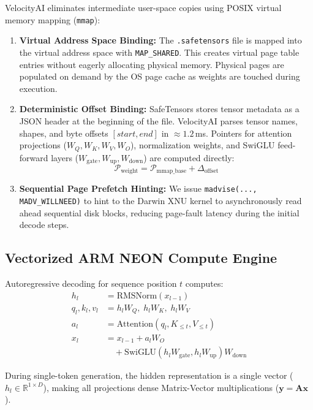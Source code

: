 \documentclass[10pt,twocolumn]{article}
\begin{document}
VelocityAI eliminates intermediate user-space copies using POSIX virtual memory mapping (\texttt{mmap}):
\begin{enumerate}
    \item \textbf{Virtual Address Space Binding:} The \texttt{.safetensors} file is mapped into the virtual address space with \texttt{MAP\_SHARED}. This creates virtual page table entries without eagerly allocating physical memory. Physical pages are populated on demand by the OS page cache as weights are touched during execution.
    \item \textbf{Deterministic Offset Binding:} SafeTensors stores tensor metadata as a JSON header at the beginning of the file. VelocityAI parses tensor names, shapes, and byte offsets $[start, end]$ in $\approx 1.2$\,ms. Pointers for attention projections ($W_Q, W_K, W_V, W_O$), normalization weights, and SwiGLU feed-forward layers ($W_{\text{gate}}, W_{\text{up}}, W_{\text{down}}$) are computed directly:
    \begin{equation}
    \mathcal{P}_{\text{weight}} = \mathcal{P}_{\text{mmap\_base}} + \Delta_{\text{offset}}
    \end{equation}
    \item \textbf{Sequential Page Prefetch Hinting:} We issue \texttt{madvise(..., MADV\_WILLNEED)} to hint to the Darwin XNU kernel to asynchronously read ahead sequential disk blocks, reducing page-fault latency during the initial decode steps.
\end{enumerate}

\subsection{Vectorized ARM NEON Compute Engine}
Autoregressive decoding for sequence position $t$ computes:
\begin{align}
h_l &= \text{RMSNorm}(x_{l-1}) \\
q_l, k_l, v_l &= h_l W_Q, \; h_l W_K, \; h_l W_V \\
a_l &= \text{Attention}(q_l, K_{\le t}, V_{\le t}) \\
x_l &= x_{l-1} + a_l W_O \nonumber \\
    &\quad + \text{SwiGLU}(h_l W_{\text{gate}}, h_l W_{\text{up}}) W_{\text{down}}
\end{align}

During single-token generation, the hidden representation is a single vector ($h_l \in \mathbb{R}^{1 \times D}$), making all projections dense Matrix-Vector multiplications ($\mathbf{y} = \mathbf{A} \mathbf{x}$).
\end{document}
